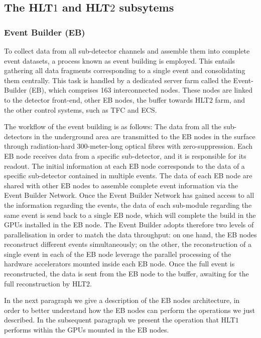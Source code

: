 \subsection{The HLT$1$ and HLT$2$ subsytems}\label{sec:HLT1eHLT2}
\subsubsection{Event Builder (EB)}
To collect data from all sub-detector channels and assemble them into complete event datasets, a process known as event building is employed. This entails gathering all data fragments corresponding to a single event and consolidating them centrally. This task is handled by a dedicated server farm called the Event-Builder (EB), which comprises 163 interconnected nodes. These nodes are linked to the detector front-end, other EB nodes, the buffer towards HLT$2$ farm, and the other control systems, such as TFC and ECS.

The workflow of the event building is as follows: 
The data from all the sub-detectors in the underground area are transmitted to the EB nodes in the surface through radiation-hard 300-meter-long optical fibres with zero-suppression. Each EB node receives data from a specific sub-detector, and it is responsible for its readout. The initial information at each EB node corresponds to the data of a specific sub-detector contained in multiple events. The data of each EB node are shared with other EB nodes to assemble complete event information via the Event Builder Network. Once the Event Builder Network has gained access to all the information regarding the events, the data of each sub-module regarding the same event is send back to a single EB node, which will complete the build in the GPUs installed in the EB node. The Event Builder adopts therefore two levels of parallelisation in order to match the data throughput: on one hand, the EB nodes reconstruct different events simultaneously; on the other, the reconstruction of a single event in each of the EB node leverage the parallel processing of the hardware accelerators mounted inside each EB node.
Once the full event is reconstructed, the data is sent from the EB node to the buffer, awaiting for the full reconstruction by HLT2. 

In the next paragraph we give a description of the EB nodes architecture, in order to better understand how the EB nodes can perform the operations we just described. In the subsequent paragraph we present the operation that HLT$1$ performs within the GPUs mounted in the EB nodes. 

